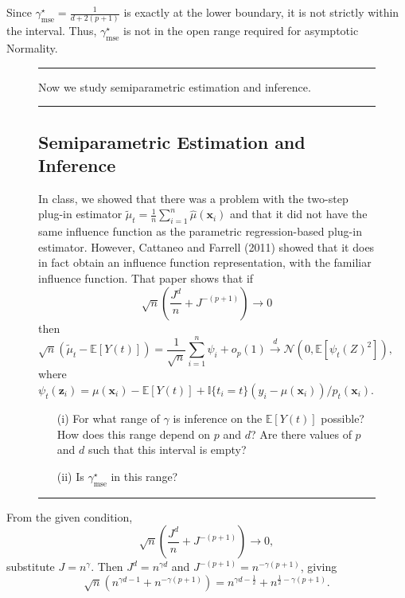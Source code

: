 \documentclass{article}
\newenvironment{colorparagraph}[1]{\par\color{#1}}{\par}
\begin{document}
Since \(\gamma^\star_{\text{mse}} = \frac{1}{d+2(p+1)}\) is exactly at the lower boundary, it is not strictly within the interval. Thus, \(\gamma^\star_{\text{mse}}\) is not in the open range required for asymptotic Normality.

\begin{figure}[H]
  \begin{colorparagraph}{questioncolor}
  \rule{\textwidth}{0.5pt}
  
  Now we study semiparametric estimation and inference.
  
  \rule{\textwidth}{0.5pt}
  \label{q1g}
  \subsection{Semiparametric Estimation and Inference}

  In class, we showed that there was a problem with the two-step plug-in estimator \( \tilde{\mu}_t = \frac{1}{n} \sum_{i=1}^n \hat{\mu}(\mathbf{x}_i) \) and that it did not have the same influence function as the parametric regression-based plug-in estimator. However, Cattaneo and Farrell (2011) showed that it does in fact obtain an influence function representation, with the familiar influence function. That paper shows that if
  \[
  \sqrt{n} \left( \frac{J^d}{n} + J^{-(p+1)} \right) \to 0
  \]
  then
  \[
  \sqrt{n} (\tilde{\mu}_t - \mathbb{E}[Y(t)]) = \frac{1}{\sqrt{n}} \sum_{i=1}^n \psi_i + o_p(1) \overset{d}{\to} \mathcal{N}(0, \mathbb{E}[\psi_t(Z)^2]),
  \]
  where \( \psi_t(\mathbf{z}_i) = \mu(\mathbf{x}_i) - \mathbb{E}[Y(t)] + \mathbb{I}\{t_i = t\}(y_i - \mu(\mathbf{x}_i)) / p_t(\mathbf{x}_i) \).

  \begin{itemize}
      \item[(i)] For what range of \( \gamma \) is inference on the \( \mathbb{E}[Y(t)] \) possible? How does this range depend on \( p \) and \( d \)? Are there values of \( p \) and \( d \) such that this interval is empty?
      \item[(ii)] Is \( \gamma^\star_{\text{mse}} \) in this range?
  \end{itemize}

  \rule{\textwidth}{0.5pt}
  \end{colorparagraph}
\end{figure}

From the given condition,
\[
\sqrt{n}\left(\frac{J^d}{n} + J^{-(p+1)}\right) \to 0,
\]
substitute \( J = n^\gamma \). Then \( J^d = n^{\gamma d} \) and \( J^{-(p+1)} = n^{-\gamma(p+1)} \), giving
\[
\sqrt{n}\left(n^{\gamma d - 1} + n^{-\gamma(p+1)}\right) = n^{\gamma d - \frac{1}{2}} + n^{\frac{1}{2} - \gamma(p+1)}.
\]
\end{document}
